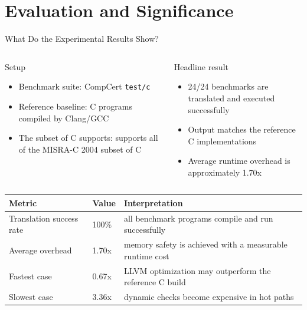 \documentclass[aspectratio=169,11pt,professionalfonts]{beamer}
\newcommand{\good}[1]{\textcolor{SJTUBlue}{#1}}
\begin{document}
\section{Evaluation and Significance}

\begin{frame}{What Do the Experimental Results Show?}
  \small
  \begin{columns}[T]
    \begin{block}{Setup}
      \begin{itemize}
        \item Benchmark suite: CompCert \texttt{test/c}
        \item Reference baseline: C programs compiled by Clang/GCC
        \item The subset of C supports: supports all of the MISRA-C 2004 subset of C
      \end{itemize}
    \end{block}
    \begin{exampleblock}{Headline result}
      \begin{itemize}
        \item \good{24/24} benchmarks are translated and executed successfully
        \item Output matches the reference C implementations
        \item Average runtime overhead is approximately \good{1.70x}
      \end{itemize}
    \end{exampleblock}
  \end{columns}

  \vspace{0.7em}
  \begin{tabular}{p{}p{}p{}}
    \toprule
    \textbf{Metric} & \textbf{Value} & \textbf{Interpretation} \\
    \midrule
    Translation success rate & 100\% & all benchmark programs compile and run successfully \\
    Average overhead & 1.70x & memory safety is achieved with a measurable runtime cost \\
    Fastest case & 0.67x & LLVM optimization may outperform the reference C build \\
    Slowest case & 3.36x & dynamic checks become expensive in hot paths \\
    \bottomrule
  \end{tabular}
\end{frame}
\end{document}
